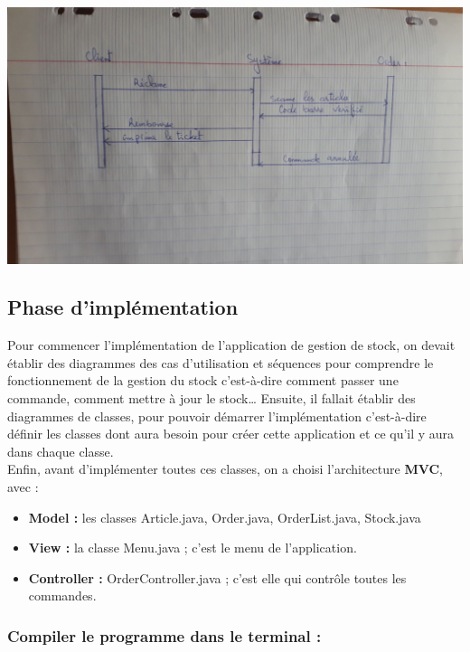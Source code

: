 \documentclass[french,10pt,a4paper]{report}
\begin{document}
\begin{center}
 	\includegraphics[scale=0.17]{captures/g_it3_4.jpg}
\end{center}

\subsection{\textcolor{bb}{Phase d’implémentation}}
Pour commencer l’implémentation de l’application de gestion de stock, on devait établir des diagrammes des cas d’utilisation et séquences pour comprendre le fonctionnement de la gestion du stock c’est-à-dire comment passer une commande, comment mettre à jour le stock…
Ensuite, il fallait établir des diagrammes de classes, pour pouvoir démarrer l’implémentation c’est-à-dire définir les classes dont aura besoin pour créer cette application et ce qu’il y aura dans chaque classe.\\
Enfin, avant d’implémenter toutes ces classes, on a choisi l’architecture \textbf{\textcolor{gg}{MVC}}, avec :\\
\begin{itemize}
\item \textbf{Model :} les classes Article.java, Order.java, OrderList.java, Stock.java 
\item \textbf{View :}  la classe Menu.java ; c’est le menu de l’application.
\item \textbf{Controller :} OrderController.java ; c’est elle qui contrôle toutes les commandes.
\end{itemize}
\subsubsection{Compiler le programme dans le terminal :}
\end{document}
